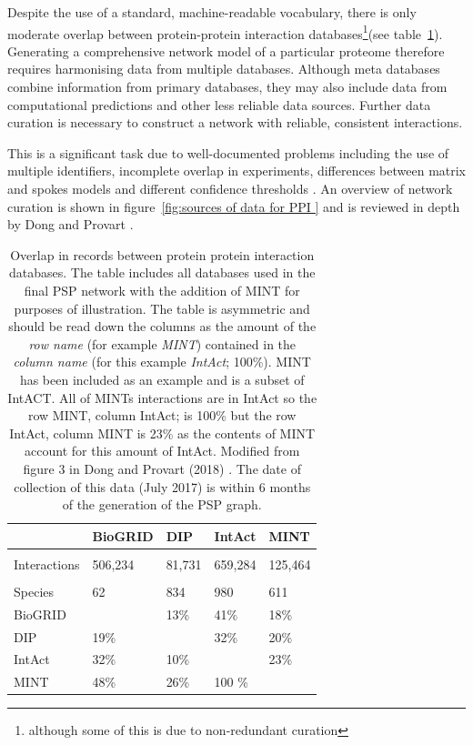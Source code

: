 Despite the use of a standard, machine-readable vocabulary, there is only moderate overlap between protein-protein interaction databases\cite{dong2018analyses}\footnote{although some of this is due to non-redundant curation}(see table~\ref{tab:overlap between protein interaction databases}). Generating  a comprehensive network model of a particular proteome therefore requires harmonising data from multiple databases\cite{alonso2019apid}.  %
Although meta databases combine information from primary databases, they may also include data from computational predictions and other less reliable data sources. Further data curation is necessary to construct a network with reliable, consistent interactions.

This is a significant task due to well-documented problems including the use of multiple identifiers, incomplete overlap in experiments, differences between matrix and spokes models and different confidence thresholds \cite{lehne2009protein}. An overview of network curation is shown in figure~\ref{fig:sources of data for PPI } and is reviewed in depth by Dong and Provart \cite{dong2018analyses}.

  \begin{table}[]
       \centering
       \begin{tabular}{lllll}
       \toprule
    &    BioGRID    & DIP & IntAct & MINT   \\
    \midrule
    \\
    Interactions & 506,234 & 81,731 & 659,284 & 125,464\\
    \midrule
    \\
    Species & 62 & 834 & 980 & 611 \\
    \midrule
    BioGRID &  & 13\% & 41\%& 18\%      \\
    DIP & 19\% & & 32\% &20\% \\
    IntAct& 32\% & 10\% & &23\% \\
    MINT& 48\% & 26\% & 100 \% & \\
    \bottomrule
       \end{tabular}
       \caption[Overlap between protein-protein interaction databases]{Overlap in records between protein protein interaction databases. The table includes all databases used in the final PSP network with the addition of MINT for purposes of illustration. The table is asymmetric and should be read down the columns as the amount of the \textit{row name} (for example \textit{MINT}) contained in the \textit{column name} (for this example \textit{IntAct}; 100\%). MINT has been included as an example and is a subset of IntACT. All of MINTs interactions are in IntAct so the row MINT, column IntAct; is 100\% but the row IntAct, column MINT is 23\% as the contents of MINT account for this amount of IntAct. Modified from figure 3 in Dong and Provart (2018) \cite{dong2018analyses}. The date of collection of this data (July 2017) is within 6 months of the generation of the PSP graph.}
       \label{tab:overlap between protein interaction databases}
   \end{table}
